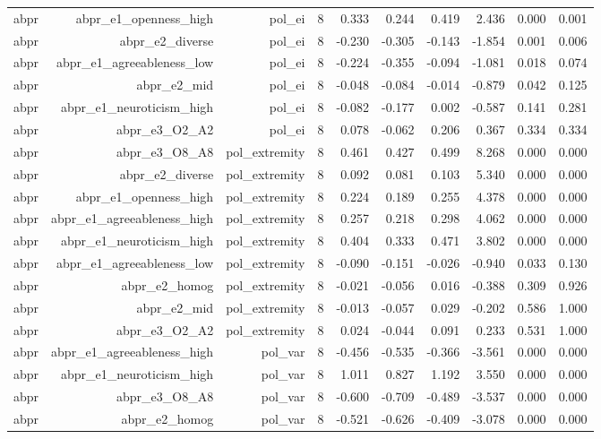 \documentclass[11pt]{article}
\begin{document}
\begin{landscape}
\begin{longtable}{@{}lrrrrrrrrr@{}}
abpr & abpr\_e1\_openness\_high & pol\_ei & 8 & 0.333 & 0.244 & 0.419 & 2.436 & 0.000 & 0.001 \\
abpr & abpr\_e2\_diverse & pol\_ei & 8 & -0.230 & -0.305 & -0.143 & -1.854 & 0.001 & 0.006 \\
abpr & abpr\_e1\_agreeableness\_low & pol\_ei & 8 & -0.224 & -0.355 & -0.094 & -1.081 & 0.018 & 0.074 \\
abpr & abpr\_e2\_mid & pol\_ei & 8 & -0.048 & -0.084 & -0.014 & -0.879 & 0.042 & 0.125 \\
abpr & abpr\_e1\_neuroticism\_high & pol\_ei & 8 & -0.082 & -0.177 & 0.002 & -0.587 & 0.141 & 0.281 \\
abpr & abpr\_e3\_O2\_A2 & pol\_ei & 8 & 0.078 & -0.062 & 0.206 & 0.367 & 0.334 & 0.334 \\
abpr & abpr\_e3\_O8\_A8 & pol\_extremity & 8 & 0.461 & 0.427 & 0.499 & 8.268 & 0.000 & 0.000 \\
abpr & abpr\_e2\_diverse & pol\_extremity & 8 & 0.092 & 0.081 & 0.103 & 5.340 & 0.000 & 0.000 \\
abpr & abpr\_e1\_openness\_high & pol\_extremity & 8 & 0.224 & 0.189 & 0.255 & 4.378 & 0.000 & 0.000 \\
abpr & abpr\_e1\_agreeableness\_high & pol\_extremity & 8 & 0.257 & 0.218 & 0.298 & 4.062 & 0.000 & 0.000 \\
abpr & abpr\_e1\_neuroticism\_high & pol\_extremity & 8 & 0.404 & 0.333 & 0.471 & 3.802 & 0.000 & 0.000 \\
abpr & abpr\_e1\_agreeableness\_low & pol\_extremity & 8 & -0.090 & -0.151 & -0.026 & -0.940 & 0.033 & 0.130 \\
abpr & abpr\_e2\_homog & pol\_extremity & 8 & -0.021 & -0.056 & 0.016 & -0.388 & 0.309 & 0.926 \\
abpr & abpr\_e2\_mid & pol\_extremity & 8 & -0.013 & -0.057 & 0.029 & -0.202 & 0.586 & 1.000 \\
abpr & abpr\_e3\_O2\_A2 & pol\_extremity & 8 & 0.024 & -0.044 & 0.091 & 0.233 & 0.531 & 1.000 \\
abpr & abpr\_e1\_agreeableness\_high & pol\_var & 8 & -0.456 & -0.535 & -0.366 & -3.561 & 0.000 & 0.000 \\
abpr & abpr\_e1\_neuroticism\_high & pol\_var & 8 & 1.011 & 0.827 & 1.192 & 3.550 & 0.000 & 0.000 \\
abpr & abpr\_e3\_O8\_A8 & pol\_var & 8 & -0.600 & -0.709 & -0.489 & -3.537 & 0.000 & 0.000 \\
abpr & abpr\_e2\_homog & pol\_var & 8 & -0.521 & -0.626 & -0.409 & -3.078 & 0.000 & 0.000 \\

\end{longtable}
\end{landscape}
\end{document}
